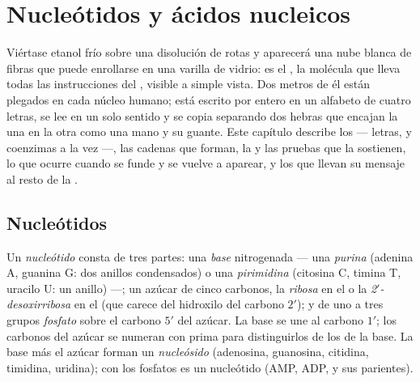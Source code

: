 \chapter{Nucleótidos y ácidos nucleicos}\label{ch:b1:nucleic-acids}

Viértase etanol frío sobre una disolución de  rotas y aparecerá una
nube blanca de fibras que puede enrollarse en una varilla de vidrio: es el
, la molécula que lleva todas las instrucciones del , visible a
simple vista. Dos metros de él están plegados en cada núcleo humano; está
escrito por entero en un alfabeto de cuatro letras, se lee en un solo
sentido y se copia separando dos hebras que encajan la una en la otra como
una mano y su guante. Este capítulo describe los  --- letras,
 y coenzimas a la vez ---, las cadenas que forman, la  y las pruebas que la sostienen, lo que ocurre cuando se funde y se
vuelve a aparear, y los  que llevan su mensaje al resto de la .

\section{Nucleótidos}

\begin{definition}[Nucleótido]\label{def:b1:nucleic-acids:nucleotide}
Un \emph{nucleótido} consta de tres partes: una
\emph{base} nitrogenada --- una
\emph{purina} (adenina A, guanina G: dos anillos condensados)
o una \emph{pirimidina} (citosina C, timina T, uracilo U:
un anillo) ---; un azúcar de cinco carbonos, la \emph{ribosa} en el  o la
\emph{2$'$-desoxirribosa} en el  (que carece del hidroxilo del carbono
$2'$); y de uno a tres grupos \emph{fosfato} sobre el carbono $5'$ del
azúcar. La base se une al carbono $1'$; los carbonos del azúcar se numeran
con prima para distinguirlos de los de la base. La base más el azúcar forman
un \emph{nucleósido} (adenosina, guanosina, citidina, timidina, uridina);
con los fosfatos es un nucleótido (AMP, ADP,  y sus parientes).
\end{definition}

